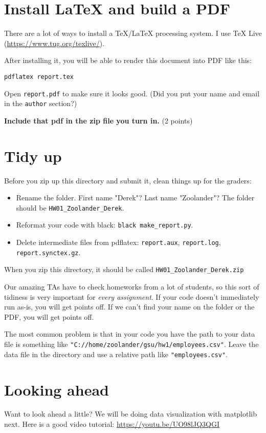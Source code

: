 \documentclass[11pt,english]{article}
\begin{document}
\section{Install LaTeX and build a PDF}

There are a lot of ways to install a TeX/LaTeX processing system.  I use TeX Live (\url{https://www.tug.org/texlive/}).

After installing it, you will be able to render this document into PDF like this:

\begin{Verbatim}
pdflatex report.tex
\end{Verbatim}

Open \texttt{report.pdf} to make sure it looks good. (Did you put your name and email in the \texttt{author} section?)

\textbf{Include that pdf in the zip file you turn in.} (2 points)

\section{Tidy up}

Before you zip up this directory and submit it, clean things up for the graders:

\begin{itemize}
\item Rename the folder.  First name "Derek"? Last name "Zoolander"? The folder should be \texttt{HW01\_Zoolander\_Derek}.
\item Reformat your code with black: \texttt{black make\_report.py}.
\item Delete intermediate files from pdflatex: \texttt{report.aux},  \texttt{report.log},  \texttt{report.synctex.gz}.
\end{itemize}

When you zip this directory, it should be called \texttt{HW01\_Zoolander\_Derek.zip}

Our amazing TAs have to check homeworks from a lot of students, so this sort of tidiness is very important for \emph{every assignment}.  If your
 code doesn't immediately run as-is,  you will get points off.  If we can't find your name on the folder or the PDF, you will get points off.  
 
The most common problem is that in your code you have the path to your data file is something like \texttt{"C://home/zoolander/gsu/hw1/employees.csv"}.    
Leave the data file in the directory and use a relative path like \texttt{"employees.csv"}.

\section{Looking ahead}

Want to look ahead a little?  We will be doing data visualization with matplotlib next.  Here is a good video tutorial:
\url{https://youtu.be/UO98lJQ3QGI}
\end{document}
